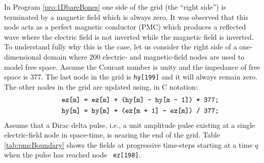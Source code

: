 In Program \ref{pro:1DbareBones} one side of the grid (the ``right
side'') is terminated by a magnetic field which is always zero.  It
was observed that this node acts as a perfect magnetic conductor (PMC)
which produces a reflected wave where the electric field is not
inverted while the magnetic field is inverted.  To understand fully
why this is the case, let us consider the right side of a
one-dimensional domain where $200$ electric- and magnetic-field nodes
are used to model free space.  Assume the Courant number is unity and
the impedance of free space is $377$.  The last node in the grid is
{\tt hy[199]} and it will always remain zero.  The other nodes in the
grid are updated using, in C notation:
\begin{eqnarray}
  \mbox{\tt\ \ \ \ ez[m] = ez[m] + (hy[m] - hy[m - 1]) * 377;} \label{eq:ezUpdateC}\\
  \mbox{\tt\ \ \ \ hy[m] = hy[m] + (ez[m + 1] - ez[m]) / 377;} \label{eq:hyUpdateC}
\end{eqnarray}
Assume that a Dirac delta pulse, i.e., a unit amplitude pulse existing
at a single electric-field node in space-time, is nearing the end of
the grid.  Table \ref{tab:pmcBoundary} shows the fields at progressive
time-steps starting at a time $q$ when the pulse has reached node {\tt
ez[198]}.


